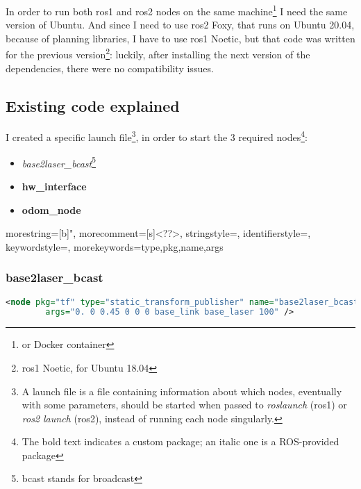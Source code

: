 In order to run both \Acrshort{ros}1 and \Acrshort{ros}2 nodes on the same machine\footnote{or Docker container} I need the same version of Ubuntu. And since I need to use \Acrshort{ros}2 Foxy, that runs on Ubuntu 20.04, because of planning libraries, I have to use \Acrshort{ros}1 Noetic, but that code was written for the previous version\footnote{\Acrshort{ros}1 Noetic, for Ubuntu 18.04}: luckily, after installing the next version of the dependencies, there were no compatibility issues.

\subsection{Existing code explained}

I created a specific launch file\footnote{A launch file is a file containing information about which nodes, eventually with some parameters, should be started when passed to {\it roslaunch} (\Acrshort{ros}1) or {\it ros2 launch} (\Acrshort{ros}2), instead of running each node singularly.}, in order to start the 3 required nodes\footnote{The bold text indicates a custom package; an italic one is a ROS-provided package}:

\begin{itemize}
    \item {\it base2laser\_bcast}\footnote{bcast stands for broadcast}
    \item {\bf hw\_interface}
    \item {\bf odom\_node}
\end{itemize}

  
  {
    morestring=[b]",
    morecomment=[s]{<?}{?>},
    stringstyle=\color{Orange},
    identifierstyle=\color{Red},
    keywordstyle=\color{Black},
    morekeywords={type,pkg,name,args}%
  }

\subsubsection{base2laser\_bcast}

\begin{lstlisting}[language=XML]
    <node pkg="tf" type="static_transform_publisher" name="base2laser_bcast"
        args="0. 0 0.45 0 0 0 base_link base_laser 100" />
\end{lstlisting}


